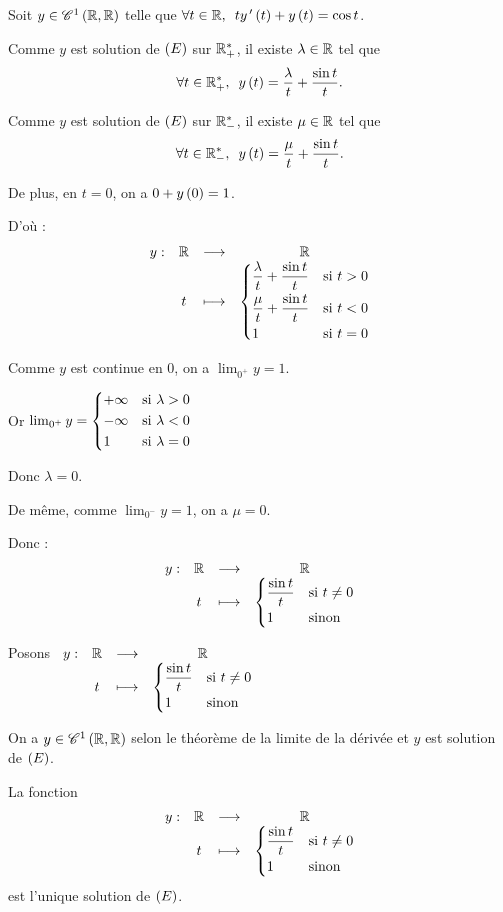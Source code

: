 \begin{corr}[2]
\analyse

Soit \(y\in\mathscr{C}^{1}\left(\mathbb{R},\mathbb{R}\right)\) telle que \(\quantifs{\forall t\in\R}ty\prim\paren{t}+y\paren{t}=\cos t\).

Comme \(y\) est solution de \(\left(E\right)\) sur \(\mathbb{R}_+^*\), il existe \(\lambda\in\mathbb{R}\) tel que \[\quantifs{\forall t\in\Rps}y\paren{t}=\dfrac{\lambda}{t}+\dfrac{\sin t}{t}.\]

Comme \(y\) est solution de \(\left(E\right)\) sur \(\mathbb{R}_-^*\), il existe \(\mu\in\mathbb{R}\) tel que \[\quantifs{\forall t\in\Rms}y\paren{t}=\dfrac{\mu}{t}+\dfrac{\sin t}{t}.\]

De plus, en \(t=0\), on a \(0+y\left(0\right)=1\).

D'où : \[\begin{array}[t]{cccc}y : & \mathbb{R} & \longrightarrow & \mathbb{R} \\ & t & \longmapsto & \begin{dcases}
\dfrac{\lambda}{t}+\dfrac{\sin t}{t} &\text{si }t>0 \\
\dfrac{\mu}{t}+\dfrac{\sin t}{t} &\text{si }t<0 \\
1 &\text{si }t=0
\end{dcases}\end{array}\]

Comme \(y\) est continue en \(0\), on a \(\lim_{0^+}y=1\).

Or \(\lim_{0^+}y=\begin{dcases}
+\infty &\text{si }\lambda>0 \\
-\infty &\text{si }\lambda<0 \\
1 &\text{si }\lambda=0
\end{dcases}\)

Donc \(\lambda=0\).

De même, comme \(\lim_{0^-}y=1\), on a \(\mu=0\).

Donc : \[\begin{array}[t]{cccc}y : & \mathbb{R} & \longrightarrow & \mathbb{R} \\ & t & \longmapsto & \begin{dcases}
\dfrac{\sin t}{t} &\text{si }t\not=0 \\
1 &\text{sinon}
\end{dcases}\end{array}\]

\synthese

Posons \(\begin{array}[t]{cccc}y : & \mathbb{R} & \longrightarrow & \mathbb{R} \\ & t & \longmapsto & \begin{dcases}
\dfrac{\sin t}{t} &\text{si }t\not=0 \\
1 &\text{sinon}
\end{dcases}\end{array}\)

On a \(y\in\mathscr{C}^{1}\left(\mathbb{R},\mathbb{R}\right)\) selon le théorème de la limite de la dérivée et \(y\) est solution de \(\left(E\right)\).

\conclusion

La fonction \[\begin{array}[t]{cccc}y : & \mathbb{R} & \longrightarrow & \mathbb{R} \\ & t & \longmapsto & \begin{dcases}
\dfrac{\sin t}{t} &\text{si }t\not=0 \\
1 &\text{sinon}
\end{dcases}\end{array}\] est l'unique solution de \(\left(E\right)\).
\end{corr}


